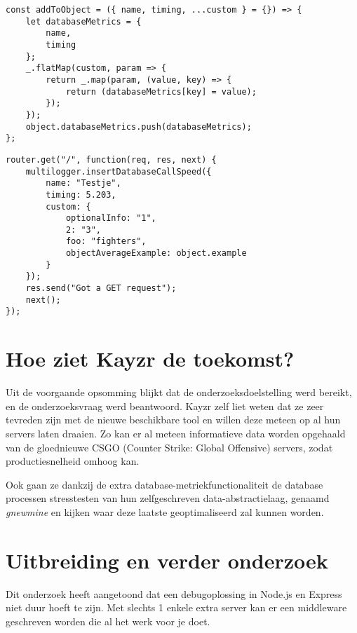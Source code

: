 \begin{lstlisting}[style=ES6, caption={Extra informatie wordt doorgestuurd naar InfluxDB},label=code:addToObject]
const addToObject = ({ name, timing, ...custom } = {}) => {
	let databaseMetrics = {
		name,
		timing
	};
	_.flatMap(custom, param => {
		return _.map(param, (value, key) => {
			return (databaseMetrics[key] = value);
		});
	});
	object.databaseMetrics.push(databaseMetrics);
};
\end{lstlisting}
\begin{minipage}{\linewidth}
\begin{lstlisting}[style=ES6, caption={Deze functie kan overal in de API worden opgeroepen},label=code:plugin]
router.get("/", function(req, res, next) {
	multilogger.insertDatabaseCallSpeed({
		name: "Testje",
		timing: 5.203,
		custom: {
			optionalInfo: "1",
			2: "3",
			foo: "fighters",
			objectAverageExample: object.example
		}
	});
	res.send("Got a GET request");
	next();
});
\end{lstlisting}
\end{minipage}

\section{Hoe ziet Kayzr de toekomst?}
\label{sec:future}

Uit de voorgaande opsomming blijkt dat de onderzoeksdoelstelling werd bereikt, en de onderzoeksvraag werd beantwoord. Kayzr zelf liet weten dat ze zeer tevreden zijn met de nieuwe beschikbare tool en willen deze meteen op al hun servers laten draaien. Zo kan er al meteen informatieve data worden opgehaald van de gloednieuwe CSGO (Counter Strike: Global Offensive) servers, zodat productiesnelheid omhoog kan.

Ook gaan ze dankzij de extra database-metriekfunctionaliteit de database processen stresstesten van hun zelfgeschreven data-abstractielaag, genaamd \textit{gnewmine} en kijken waar deze laatste geoptimaliseerd zal kunnen worden.

\section{Uitbreiding en verder onderzoek}
\label{sec:expansin}

Dit onderzoek heeft aangetoond dat een debugoplossing in Node.js en Express niet duur hoeft te zijn. Met slechts 1 enkele extra server kan er een middleware geschreven worden die al het werk voor je doet. 

